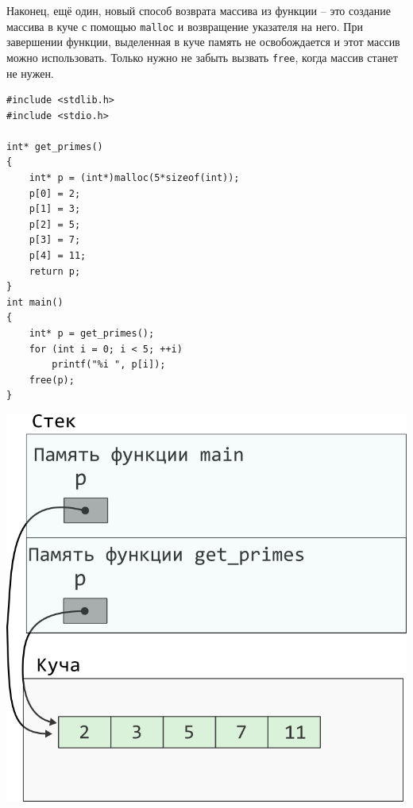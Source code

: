 \documentclass{article}
\begin{document}
Наконец, ещё один, новый способ возврата массива из функции -- это создание
массива в куче с помощью \texttt{malloc} и возвращение указателя на него.
При завершении функции, выделенная в куче память не освобождается и этот массив
можно использовать. Только нужно не забыть вызвать \texttt{free}, когда 
массив станет не нужен.
\begin{multicols}{2}
\begin{lstlisting}
#include <stdlib.h>
#include <stdio.h>

int* get_primes() 
{
    int* p = (int*)malloc(5*sizeof(int));
    p[0] = 2;
    p[1] = 3;
    p[2] = 5;
    p[3] = 7;
    p[4] = 11;
    return p;
}
int main() 
{
    int* p = get_primes();
    for (int i = 0; i < 5; ++i)
        printf("%i ", p[i]);
    free(p);
}
\end{lstlisting}
\columnbreak
\begin{center}
\includegraphics[scale=1]{../images/pointer_schemes/function_return_heap_array.png}
\end{center}
\end{multicols}
\end{document}
